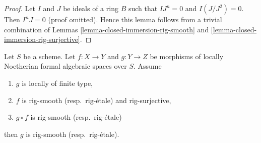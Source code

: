 \begin{proof}
Let $I$ and $J$ be ideals of a ring $B$ such that $IJ^n = 0$ and
$I(J/J^2) = 0$. Then $I^nJ = 0$ (proof omitted).
Hence this lemma follows from a trivial combination of
Lemmas \ref{lemma-closed-immersion-rig-smooth} and
\ref{lemma-closed-immersion-rig-surjective}.
\end{proof}

\begin{lemma}
\label{lemma-rig-etale-descent}
Let $S$ be a scheme. Let $f : X \to Y$ and $g : Y \to Z$
be morphisms of locally Noetherian formal algebraic spaces over $S$.
Assume
\begin{enumerate}
\item $g$ is locally of finite type,
\item $f$ is rig-smooth (resp.\ rig-\'etale) and rig-surjective,
\item $g \circ f$ is rig-smooth (resp.\ rig-\'etale)
\end{enumerate}
then $g$ is rig-smooth (resp.\ rig-\'etale).
\end{lemma}

